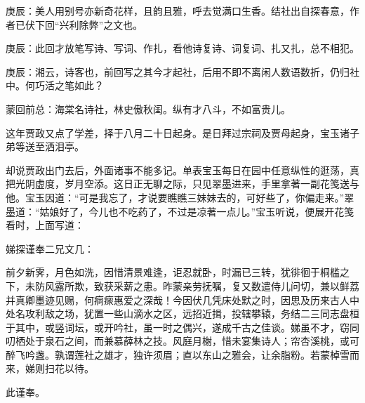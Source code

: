 
\begin{parag}
    \begin{note}庚辰：美人用别号亦新奇花样，且韵且雅，呼去觉满口生香。结社出自探春意，作者已伏下回“兴利除弊”之文也。\end{note}
\end{parag}


\begin{parag}
    \begin{note}庚辰：此回才放笔写诗、写词、作扎，看他诗复诗、词复词、扎又扎，总不相犯。\end{note}
\end{parag}


\begin{parag}
    \begin{note}庚辰：湘云，诗客也，前回写之其今才起社，后用不即不离闲人数语数折，仍归社中。何巧活之笔如此？\end{note}
\end{parag}


\begin{parag}
    \begin{note}蒙回前总：海棠名诗社，林史傲秋闺。纵有才八斗，不如富贵儿。\end{note}
\end{parag}


\begin{parag}
    这年贾政又点了学差，择于八月二十日起身。是日拜过宗祠及贾母起身，宝玉诸子弟等送至洒泪亭。
\end{parag}


\begin{parag}
    却说贾政出门去后，外面诸事不能多记。单表宝玉每日在园中任意纵性的逛荡，真把光阴虚度，岁月空添。这日正无聊之际，只见翠墨进来，手里拿著一副花笺送与他。宝玉因道：“可是我忘了，才说要瞧瞧三妹妹去的，可好些了，你偏走来。”翠墨道：“姑娘好了，今儿也不吃药了，不过是凉著一点儿。”宝玉听说，便展开花笺看时，上面写道：
\end{parag}


\begin{qute}
    娣探谨奉二兄文几：
    \begin{parag}
        前夕新霁，月色如洗，因惜清景难逢，讵忍就卧，时漏已三转，犹徘徊于桐槛之下，未防风露所欺，致获采薪之患。昨蒙亲劳抚嘱，复又数遣侍儿问切，兼以鲜荔并真卿墨迹见赐，何痌瘝惠爱之深哉！今因伏几凭床处默之时，因思及历来古人中处名攻利敌之场，犹置一些山滴水之区，远招近揖，投辖攀辕，务结二三同志盘桓于其中，或竖词坛，或开吟社，虽一时之偶兴，遂成千古之佳谈。娣虽不才，窃同叨栖处于泉石之间，而兼慕薛林之技。风庭月榭，惜未宴集诗人；帘杏溪桃，或可醉飞吟盏。孰谓莲社之雄才，独许须眉；直以东山之雅会，让余脂粉。若蒙棹雪而来，娣则扫花以待。
    \end{parag}
    \begin{parag}
        此谨奉。
    \end{parag}
\end{qute}


